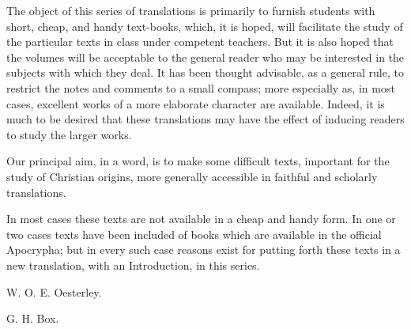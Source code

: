 
The object of this series of translations is primarily
to furnish students with short, cheap, and handy
text-books, which, it is hoped, will facilitate the
study of the particular texts in class under competent
teachers. But it is also hoped that the
volumes will be acceptable to the general reader
who may be interested in the subjects with which
they deal. It has been thought advisable, as a
general rule, to restrict the notes and comments to
a small compass; more especially as, in most cases,
excellent works of a more elaborate character are
available. Indeed, it is much to be desired that
these translations may have the effect of inducing
readers to study the larger works.

Our principal aim, in a word, is to make some
difficult texts, important for the study of Christian
origins, more generally accessible in faithful and
scholarly translations.

In most cases these texts are not available in a
cheap and handy form. In one or two cases texts
have been included of books which are available
in the official Apocrypha; but in every such case
reasons exist for putting forth these texts in a new
translation, with an Introduction, in this series.

W. O. E. Oesterley.

G. H. Box.




